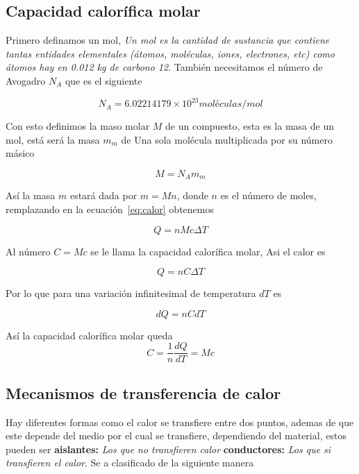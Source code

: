 \subsection{Capacidad calorífica molar}
Primero definamos un mol, \textit{Un mol es la cantidad
de sustancia que contiene tantas entidades elementales (átomos, moléculas, iones, electrones, etc)
como átomos hay en 0.012 kg de carbono 12}. También necesitamos
el número de Avogadro $N_A$ que es el siguiente

\begin{equation*}
    N_A = 6.02214179\times 10^{23} \unit{moléculas/mol}
\end{equation*}

Con esto definimos la maso molar $M$ de un compuesto,
esta es la masa de un mol, está será la masa $m_m$ de Una sola molécula
multiplicada por su número másico

\begin{equation}
    M = N_A m_m
\end{equation}

Así la masa $m$ estará dada por $m = M n$, donde $n$
es el número de moles, remplazando en la ecuación~\ref{eq:calor}
obtenemos

\begin{equation}
    Q = nMc\Delta T
\end{equation}

Al número $C = Mc$ se le llama la capacidad calorífica molar,
Asi el calor es

\begin{equation}
    \label{eq:calor-molar}
    Q = nC\Delta T
\end{equation}

Por lo que para una variación infinitesimal de 
temperatura $dT$ es

\begin{equation*}
    dQ = nCdT
\end{equation*}

Así la capacidad calorífica molar queda
\begin{equation}
    \label{eq:calor-especifico-molar}
    C = \frac{1}{n}\frac{dQ}{dT} = Mc
\end{equation}

\subsection{Mecanismos de transferencia de calor}
Hay diferentes formas como el calor se transfiere
entre dos puntos, ademas de que este depende del medio 
por el cual se transfiere, dependiendo 
del material, estos pueden
ser \textbf{aislantes:} \textit{Los que no transfieren
calor} \textbf{conductores: } \textit{Los que si transfieren
el calor}. Se a clasificado de la siguiente manera


